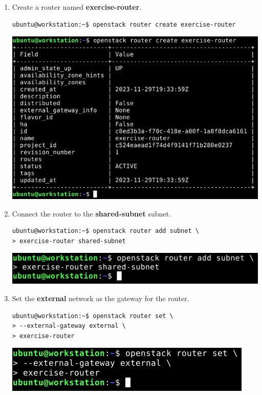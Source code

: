 \documentclass[letterpaper, 12pt]{article}
\begin{document}
\begin{enumerate}
\item Create a router named \textbf{exercise-router}.
\begin{lstlisting}
ubuntu@workstation:~$ openstack router create exercise-router
\end{lstlisting}

    \begin{center}
        \includegraphics[width=\linewidth]{images/part1/step10.png}
    \end{center}

    \item Connect the router to the \textbf{shared-subnet} subnet.
\begin{lstlisting}
ubuntu@workstation:~$ openstack router add subnet \
> exercise-router shared-subnet
\end{lstlisting}

    \begin{center}
        \includegraphics[width=\linewidth]{images/part1/step11.png}
    \end{center}

    \item Set the \textbf{external} network as the gateway for the router.
\begin{lstlisting}
ubuntu@workstation:~$ openstack router set \
> --external-gateway external \
> exercise-router
\end{lstlisting}

    \begin{center}
        \includegraphics[width=\linewidth]{images/part1/step12.png}
    \end{center}


\end{enumerate}
\end{document}
